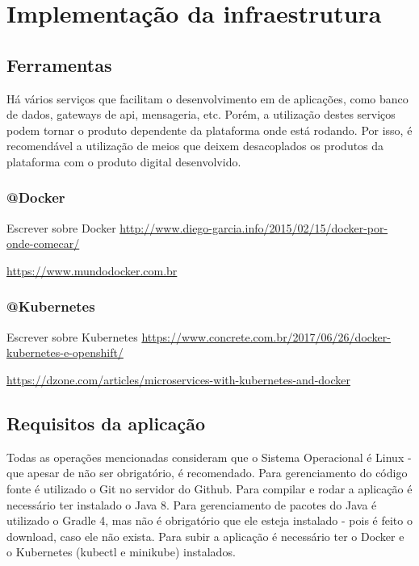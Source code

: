 \chapter{Implementação da infraestrutura}\label{implementação-da-infraestrutura}

\section{Ferramentas}\label{ferramentas}


Há vários serviços que facilitam o desenvolvimento em de aplicações, como banco de dados,
gateways de api, mensageria, etc. Porém, a utilização destes serviços podem
tornar o produto dependente da plataforma onde está rodando. Por isso, é recomendável
a utilização de meios que deixem desacoplados os produtos da plataforma com o produto
digital desenvolvido.

\subsection{@Docker}\label{docker}

Escrever sobre Docker
\url{http://www.diego-garcia.info/2015/02/15/docker-por-onde-comecar/}

\url{https://www.mundodocker.com.br}

\subsection{@Kubernetes}\label{kubernetes}

Escrever sobre Kubernetes
\url{https://www.concrete.com.br/2017/06/26/docker-kubernetes-e-openshift/}

\url{https://dzone.com/articles/microservices-with-kubernetes-and-docker}



\section{Requisitos da aplicação}\label{requisitos-da-aplicacao}

Todas as operações mencionadas consideram que o Sistema Operacional é Linux
- que apesar de não ser obrigatório, é recomendado.
Para gerenciamento do código fonte é utilizado o Git no servidor do Github.
Para compilar e rodar a aplicação é necessário ter instalado o Java 8.
Para gerenciamento de pacotes do Java é utilizado o Gradle 4, mas não
é obrigatório que ele esteja instalado - pois é feito o download, caso
ele não exista. Para subir a aplicação é necessário ter o Docker e o
Kubernetes (kubectl e minikube) instalados.

